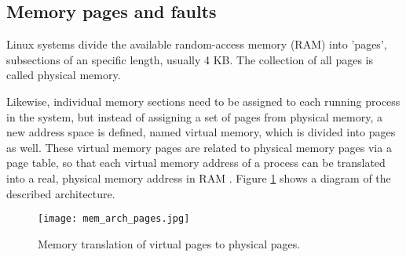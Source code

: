 \subsection{Memory pages and faults} \label{subsection:mem_faults}
Linux systems divide the available random-access memory (RAM) into 'pages', subsections of an specific length, usually 4 KB. The collection of all pages is called physical memory.

Likewise, individual memory sections need to be assigned to each running process in the system, but instead of assigning a set of pages from physical memory, a new address space is defined, named virtual memory, which is divided into pages as well. These virtual memory pages are related to physical memory pages via a page table, so that each virtual memory address of a process can be translated into a real, physical memory address in RAM \cite{mem_page_arch}. Figure \ref{fig:mem_arch_pages} shows a diagram of the described architecture.

\begin{figure}[htbp]
	\centering
	\texttt{[image: mem\_arch\_pages.jpg]}
	\caption{Memory translation of virtual pages to physical pages.}
	\label{fig:mem_arch_pages}
\end{figure}

